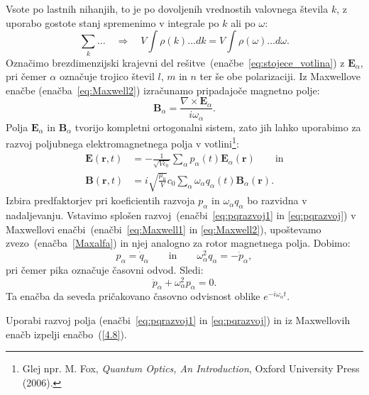 Vsote po lastnih nihanjih, to je po dovoljenih vrednostih valovnega števila $k$,
z uporabo gostote stanj spremenimo v integrale po $k$ ali po $\omega$:
\begin{equation}
\sum_{k}\ldots \quad \Rightarrow \quad V\int\rho(k)\ldots dk=V\int\rho(\omega)\ldots d\omega.
\label{4.5}
\end{equation}
Označimo brezdimenzijski krajevni del rešitve~(enačbe~\ref{eq:stojece_votlina}) z 
$\mathbf{E}_{\alpha}$, pri čemer $\alpha$
označuje trojico števil $l$, $m$ in $n$ ter še obe polarizaciji. Iz
Maxwellove enačbe (enačba~\ref{eq:Maxwell2}) izračunamo pripadajoče magnetno polje:
\begin{equation}
\mathbf{B}_{\alpha} = \frac{\nabla\times\mathbf{E}_{\alpha}}{i\omega_\alpha}.
\label{Maxalfa}
\end{equation}
Polja $\mathbf{E}_{\alpha}$ in $\mathbf{B}_{\alpha}$ tvorijo kompletni ortogonalni
sistem, zato jih lahko uporabimo za razvoj poljubnega elektromagnetnega polja v 
votlini\footnote{Glej npr. M. Fox, {\it Quantum Optics, 
An Introduction}, Oxford University Press (2006).}:
\begin{align}
\mathbf{E}(\mathbf{r},t) & =  -\frac{1}{\sqrt{V\epsilon_{0}}}
\sum_{\alpha}p_{\alpha}(t)\mathbf{E}_{\alpha}(\mathbf{r}) \qquad \mathrm{in} \label{eq:pqrazvoj1}\\
\mathbf{B}(\mathbf{r},t) & =  i\sqrt{\frac{\mu_{0}}{V}}c_0\sum_{\alpha}
\omega_{\alpha}q_{\alpha}(t)\mathbf{B}_{\alpha}(\mathbf{r}).
\label{eq:pqrazvoj}
\end{align}
Izbira predfaktorjev pri koeficientih razvoja $p_\alpha$ in $\omega_\alpha q_\alpha$ bo razvidna
v nadaljevanju. Vstavimo splošen razvoj~(enačbi~\ref{eq:pqrazvoj1} in \ref{eq:pqrazvoj}) v 
Maxwellovi enačbi~(enačbi~\ref{eq:Maxwell1} in \ref{eq:Maxwell2}), 
upoštevamo zvezo~(enačba~\ref{Maxalfa}) in njej analogno za rotor magnetnega polja. Dobimo:
\begin{equation}
p_{\alpha}=\dot{q}_{\alpha} \qquad \mathrm{in} \qquad 
\omega_{\alpha}^{2}q_{\alpha}=-\dot{p}_{\alpha},
\label{4.7}
\end{equation}
pri čemer pika označuje časovni odvod. Sledi:
\begin{equation}
\ddot{p}_{\alpha}+\omega_{\alpha}^{2}p_{\alpha}=0.
\label{4.8}
\end{equation}
Ta enačba da seveda pričakovano časovno odvisnost oblike $e^{-i \omega_\alpha t}$.

\begin{naloga}
 Uporabi razvoj polja (enačbi~\ref{eq:pqrazvoj1} in \ref{eq:pqrazvoj}) 
 in iz Maxwellovih enačb izpelji
 enačbo~(\ref{4.8}).
\end{naloga}

